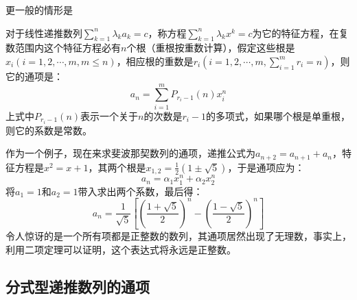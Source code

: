 更一般的情形是
\begin{theorem}
对于线性递推数列$\sum_{k=1}^n\lambda _k a_k=c$，称方程$\sum_{k=1}^n\lambda _k x^k = c$为它的特征方程，在复数范围内这个特征方程必有$n$个根（重根按重数计算），假定这些根是 $x_i(i=1,2,\cdots,m, m \leq n)$，相应根的重数是$r_i(i=1,2,\cdots,m, \sum_{i=1}^mr_i=n)$，则它的通项是：
\[ a_n=\sum_{i=1}^mP_{r_i-1}(n)x_i^n \]
上式中$P_{r_i-1}(n)$表示一个关于$n$的次数是$r_i-1$的多项式，如果哪个根是单重根，则它的系数是常数。
\end{theorem}

\begin{example}
作为一个例子，现在来求斐波那契数列的通项，递推公式为$a_{n+2}=a_{n+1}+a_n$，特征方程是$x^2=x+1$，其两个根是$x_{1,2}=\frac{1}{2}(1 \pm \sqrt{5})$，于是通项应为：
\[ a_n=\alpha _1 x_1^n+ \alpha _2 x_2^n \]
将$a_1=1$和$a_2=1$带入求出两个系数，最后得：
\[ a_n= \frac{1}{\sqrt{5}}\left[ \left( \frac{1+\sqrt{5}}{2} \right)^n - \left( \frac{1-\sqrt{5}}{2} \right)^n \right] \]
令人惊讶的是一个所有项都是正整数的数列，其通项居然出现了无理数，事实上，利用二项定理可以证明，这个表达式将永远是正整数。
\end{example}



\subsection{分式型递推数列的通项}

